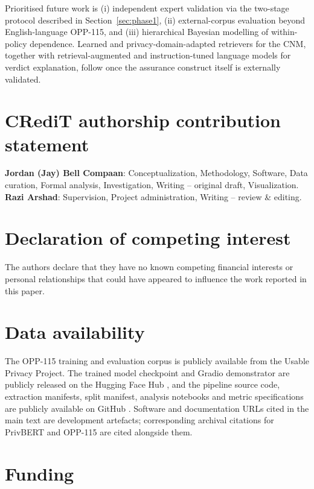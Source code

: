 \documentclass[final,3p,times,twocolumn]{elsarticle}
\begin{document}
	Prioritised future work is (i) independent expert validation via the two-stage
	protocol described in Section~\ref{sec:phase1}, (ii) external-corpus
	evaluation beyond English-language OPP-115, and (iii) hierarchical Bayesian modelling
	of within-policy dependence. Learned and privacy-domain-adapted retrievers for
	the CNM, together with retrieval-augmented and instruction-tuned language models
	for verdict explanation, follow once the assurance construct itself is
	externally validated.
  	\section*{CRediT authorship contribution statement}
	\textbf{Jordan (Jay) Bell Compaan}: Conceptualization, Methodology, Software, Data
	curation, Formal analysis, Investigation, Writing -- original draft,
	Visualization. \textbf{Razi Arshad}: Supervision, Project administration, Writing
	-- review \& editing.

	\section*{Declaration of competing interest}
	The authors declare that they have no known competing financial interests or
	personal relationships that could have appeared to influence the work reported
	in this paper.

	\section*{Data availability}
	The OPP-115 training and evaluation corpus is publicly available from the
	Usable Privacy Project. The trained model checkpoint and Gradio demonstrator are
	publicly released on the Hugging Face Hub \citep{prertcnm_huggingface}, and the
	pipeline source code, extraction manifests, split manifest, analysis notebooks
	and metric specifications are publicly available on GitHub \citep{prertcnm_github}.
	Software and documentation URLs cited in the main text are development
	artefacts; corresponding archival citations for PrivBERT \citep{srinath2021privaseer}
	and OPP-115 \citep{wilson2016opp115} are cited alongside them. 

	\section*{Funding}
	
\end{document}
